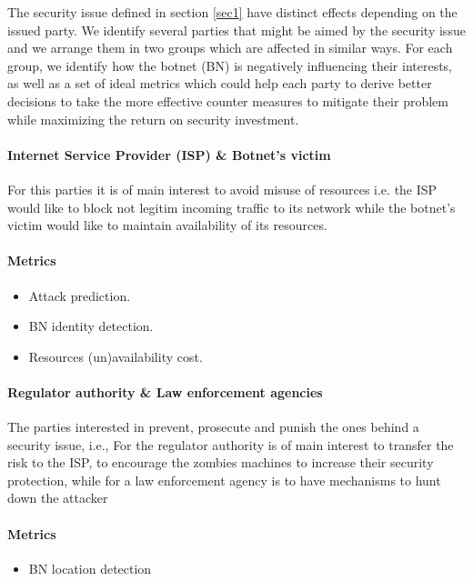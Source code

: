 
The security issue defined in section \ref{sec1} have distinct effects depending on the issued party. We identify several parties that might be aimed by the security issue and we arrange them in two groups which are affected in similar ways. For each group, we identify how the botnet (BN) is negatively influencing their interests, as well as a set of ideal metrics which could help each party to derive better decisions to take the more effective counter measures to mitigate their problem while maximizing the return on security investment.

\indent
\paragraph{Internet Service Provider (ISP) \& Botnet's victim}
For this parties it is of main interest to avoid misuse of resources i.e. the ISP would like to block not legitim incoming traffic to its network while the botnet's victim would like to maintain availability of its resources.
\paragraph{Metrics}
\begin{itemize}
    \item Attack prediction.
    \item BN identity detection.
    \item Resources (un)availability cost.
\end{itemize}
\indent
\indent
\paragraph{Regulator authority \& Law enforcement agencies}
The parties interested in prevent, prosecute and punish the ones behind a security issue, i.e., For the regulator authority is of main interest to transfer the risk to the ISP, to encourage the zombies machines to increase their security protection, while for a law enforcement agency is to have mechanisms to hunt down the attacker
\paragraph{Metrics}
\begin{itemize}
    \item BN location detection
\end{itemize}


